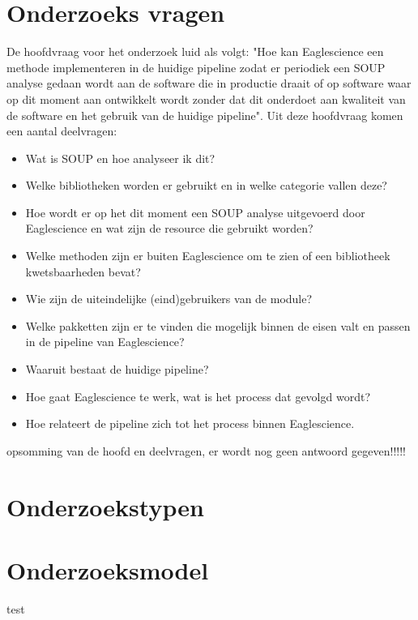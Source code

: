 \section{Onderzoeks vragen}
De hoofdvraag voor het onderzoek luid als volgt: "Hoe kan Eaglescience een methode implementeren in de huidige pipeline zodat er periodiek een SOUP analyse gedaan wordt aan de software die in productie draait of op software waar op dit moment aan ontwikkelt wordt zonder dat dit onderdoet aan kwaliteit van de software en het gebruik van de huidige pipeline". Uit deze hoofdvraag komen een aantal deelvragen:
\begin{itemize}
\item Wat is SOUP en hoe analyseer ik dit?
\item Welke bibliotheken worden er gebruikt en in welke categorie vallen deze?
\item Hoe wordt er op het dit moment een SOUP analyse uitgevoerd door Eaglescience en wat zijn de resource die gebruikt worden?
\item Welke methoden zijn er buiten Eaglescience om te zien of een bibliotheek kwetsbaarheden bevat?
\item Wie zijn de uiteindelijke (eind)gebruikers van de module?

\item Welke pakketten zijn er te vinden die mogelijk binnen de eisen valt en passen in de pipeline van Eaglescience?
\item Waaruit bestaat de huidige pipeline?
\item Hoe gaat Eaglescience te werk, wat is het process dat gevolgd wordt?
\item Hoe relateert de pipeline zich tot het process binnen Eaglescience.
\end{itemize}

opsomming van de hoofd en deelvragen, er wordt nog geen antwoord gegeven!!!!!
\section{Onderzoekstypen}
\section{Onderzoeksmodel}
test
